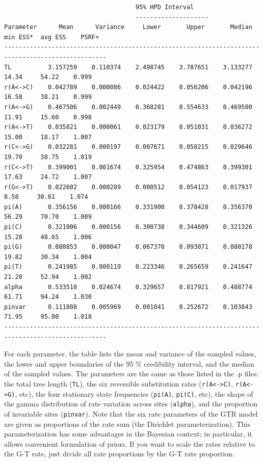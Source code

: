 \documentclass[12pt]{book}
\begin{document}
\begin{singlespacing}
\scriptsize
\begin{verbatim}
                                    95% HPD Interval
                                    --------------------
Parameter      Mean      Variance     Lower       Upper       Median    min ESS*  avg ESS    PSRF+ 
--------------------------------------------------------------------------------------------------
TL          3.157259    0.110374    2.498745    3.787651    3.133277     14.34     54.22    0.999
r(A<->C)    0.042789    0.000086    0.024422    0.056206    0.042196     16.58     38.21    0.999
r(A<->G)    0.467506    0.002449    0.368281    0.554633    0.469500     11.91     15.60    0.998
r(A<->T)    0.035821    0.000061    0.023179    0.051031    0.036272     15.00     18.17    1.007
r(C<->G)    0.032281    0.000197    0.007671    0.058215    0.029646     19.70     38.75    1.019
r(C<->T)    0.399001    0.001674    0.325954    0.474863    0.399301     17.63     24.72    1.007
r(G<->T)    0.022602    0.000289    0.000512    0.054123    0.017937      8.58     30.61    1.074
pi(A)       0.356156    0.000166    0.331900    0.378428    0.356370     56.29     70.70    1.009
pi(C)       0.321006    0.000156    0.300738    0.344609    0.321326     15.28     48.65    1.006
pi(G)       0.080853    0.000047    0.067370    0.093071    0.080178     19.82     30.34    1.004
pi(T)       0.241985    0.000119    0.223346    0.265659    0.241647     21.20     52.94    1.002
alpha       0.533518    0.024674    0.329657    0.817921    0.488774     61.71     94.24    1.030
pinvar      0.111808    0.005969    0.001041    0.252672    0.103843     71.95     95.00    1.018
--------------------------------------------------------------------------------------------------
\end{verbatim}
\normalsize
\end{singlespacing}

For each parameter, the table lists the mean and variance of the sampled values, the lower and upper 
boundaries of the 95 \% credibility interval, and the median of the sampled values. The parameters are the 
same as those listed in the .p files: the total tree length (\texttt{TL}), the six reversible substitution 
rates (\texttt{r(A<->C)}, \texttt{r(A<->G)}, etc), the four stationary state frequencies (\texttt{pi(A)}, 
\texttt{pi(C)}, etc), the shape of the gamma distribution of rate variation across sites (\texttt{alpha}), 
and the proportion of invariable sites (\texttt{pinvar}). Note that the six rate parameters of the GTR model 
are given as proportions of the rate sum (the Dirichlet parameterization). This parameterization has some 
advantages in the Bayesian context; in particular, it allows convenient formulation of priors. If you want 
to scale the rates relative to the G-T rate, just divide all rate proportions by the G-T rate proportion.
\end{document}
